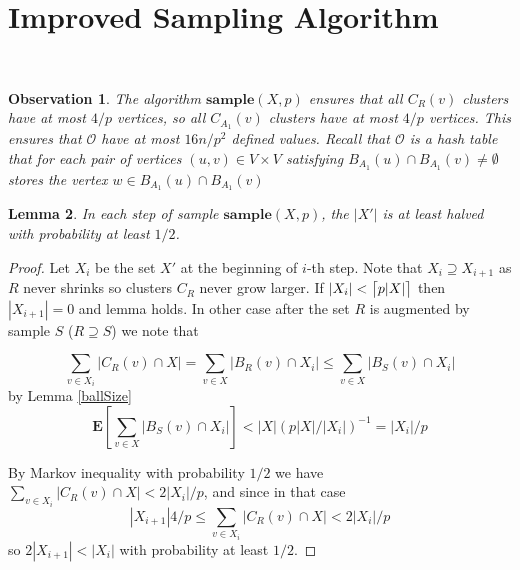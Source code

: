 \documentclass[shortabstract, lic, english]{iithesis}
\theoremstyle{definition} \newtheorem{definition}{Definition}[chapter]
\theoremstyle{plain} \newtheorem{remark}[definition]{Observation}
\theoremstyle{plain} \newtheorem{theorem}[definition]{Theorem}
\theoremstyle{plain} \newtheorem{lemma}[definition]{Lemma}
\theoremstyle{plain} \newtheorem{conjecture}[definition]{Conjecture}
\DeclarePairedDelimiter{\ceil}{\lceil}{\rceil}
\begin{document}
\section{Improved Sampling Algorithm}

\noindent{}

~

\begin{remark} \label{clusterSize}
The algorithm $\mathbf{sample}(X, p)$ ensures that all $C_R(v)$ clusters have at most $4/p$ vertices, so all $C_{A_1}(v)$ clusters have at most $4/p$ vertices.
This ensures that $\mathcal{O}$ have at most $16n/p^2$ defined values.
Recall that $\mathcal{O}$ is a hash table that for each pair of vertices $(u,v) \in V \times V$ satisfying $B_{A_1}(u) \cap B_{A_1}(v) \neq \emptyset$ stores the vertex $w \in B_{A_1}(u) \cap B_{A_1}(v)$ 
\end{remark}

\begin{lemma} \label{algSampleLogSteps}
    In each step of sample $\mathbf{sample}(X, p)$, the $|X'|$ is at least halved with probability at least $1/2$.
\end{lemma}

\begin{proof}
    Let $X_i$ be the set $X'$ at the beginning of $i$-th step. Note that $X_i \supseteq X_{i+1}$ as $R$ never shrinks so clusters $C_R$ never grow larger.
    If $|X_i| < \ceil[\big]{p  |X|}$ then $|X_{i+1}| = 0$ and lemma holds.
    In other case after the set $R$ is augmented by sample $S$ ($R \supseteq S$) we note that
    

    $$\sum_{v \in X_i} |C_R(v) \cap X| = \sum_{v \in X} |B_R(v) \cap X_i| \leq \sum_{v \in X} |B_S(v) \cap X_i| $$
    by Lemma \ref{ballSize}
    $$\mathbf{E}[\sum_{v \in X} |B_S(v) \cap X_i|] < |X|  (p  |X|/|X_i|)^{-1} = |X_i|/p$$

    By Markov inequality with probability $1/2$ we have $\sum_{v \in X_i} |C_R(v) \cap X| < 2|X_i|/p$,
    and since in that case 
    $$|X_{i+1}|  4/p \leq \sum_{v \in X_i} |C_R(v) \cap X| < 2|X_i|/p$$
    so $2  |X_{i+1}| < |X_i|$ with probability at least $1/2$.
\end{proof}
\end{document}
